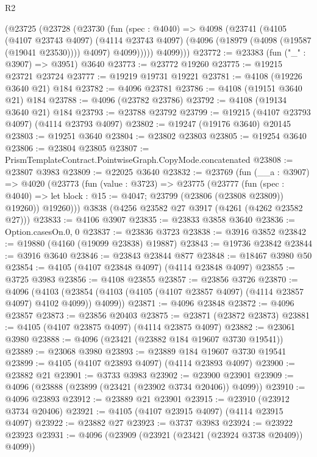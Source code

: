 \begin{lexlean}{R2}
\begin{coremodule}
        (@23725
          (@23728
            (@23730
              (fun (spec : @4040) =>
              @4098
                (@23741
                  (@4105
                    (@4107 @23743 @4097)
                    (@4114 @23743 @4097)
                    (@4096 (@18979 (@4098 (@19587 (@19041 @23530)))) @4097)
                    @4099)))))
          @4099)))
@23772 := @23383 (fun ("_" : @3907) => @3951) @3640
@23773 := @23772 @19260
@23775 := @19215 @23721 @23724
@23777 := @19219 @19731 @19221
@23781 := @4108 (@19226 @3640 @21) @184
@23782 := @4096 @23781
@23786 := @4108 (@19151 @3640 @21) @184
@23788 := @4096 (@23782 @23786)
@23792 := @4108 (@19134 @3640 @21) @184
@23793 := @23788 @23792
@23799 := @19215 (@4107 @23793 @4097) (@4114 @23793 @4097)
@23802 := @19247 (@19176 @3640) @20145
@23803 := @19251 @3640
@23804 := @23802 @23803
@23805 := @19254 @3640
@23806 := @23804 @23805
@23807 := PrismTemplateContract.PointwiseGraph.CopyMode.concatenated
@23808 := @23807 @3983
@23809 := @22025 @3640
@23832 := @23769
    (fun (__a : @3907) =>
    @4020
      (@23773
        (fun (value : @3723) =>
        @23775
          (@23777
            (fun (spec : @4040) =>
            let block : @15 := @4047; @23799 (@23806 (@23808 @23809)) @19260))
          @19260)))
    @3838
    (@4256 @23582 @27 @3917 (@4261 (@4262 @23582 @27)))
@23833 := @4106 @3907
@23835 := @23833 @3858 @3640
@23836 := Option.casesOn.{0, 0}
@23837 := @23836 @3723
@23838 := @3916 @3852
@23842 := @19880 (@4160 (@19099 @23838) @19887)
@23843 := @19736 @23842
@23844 := @3916 @3640
@23846 := @23843 @23844 @877
@23848 := @18467 @3980 @50
@23854 := @4105 (@4107 @23848 @4097) (@4114 @23848 @4097)
@23855 := @3725 @3983
@23856 := @4108 @23855
@23857 := @23856 @3726
@23870 := @4096
    (@4103 (@23854 (@4103 (@4105 (@4107 @23857 @4097) (@4114 @23857 @4097) @4102 @4099)) @4099))
@23871 := @4096 @23848
@23872 := @4096 @23857
@23873 := @23856 @20403
@23875 := @23871 (@23872 @23873)
@23881 := @4105 (@4107 @23875 @4097) (@4114 @23875 @4097)
@23882 := @23061 @3980
@23888 := @4096 (@23421 (@23882 @184 @19607 @3730 @19541))
@23889 := @23068 @3980
@23893 := @23889 @184 @19607 @3730 @19541
@23899 := @4105 (@4107 @23893 @4097) (@4114 @23893 @4097)
@23900 := @23882 @21
@23901 := @3733 @3983
@23902 := @23900 @23901
@23909 := @4096 (@23888 (@23899 (@23421 (@23902 @3734 @20406)) @4099))
@23910 := @4096 @23893
@23912 := @23889 @21 @23901
@23915 := @23910 (@23912 @3734 @20406)
@23921 := @4105 (@4107 @23915 @4097) (@4114 @23915 @4097)
@23922 := @23882 @27
@23923 := @3737 @3983
@23924 := @23922 @23923
@23931 := @4096 (@23909 (@23921 (@23421 (@23924 @3738 @20409)) @4099))

\end{coremodule}
\end{lexlean}
